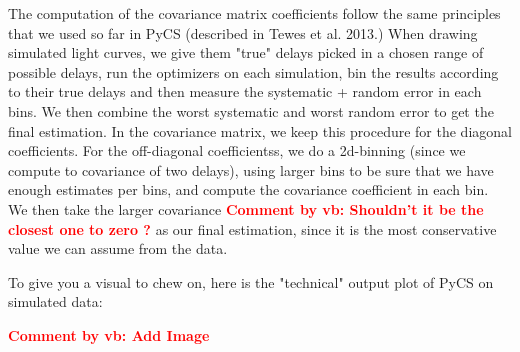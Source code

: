 \documentclass[11pt]{scrartcl}
\newcommand{\com}[2]{\xspace\textcolor{red}{\textbf{Comment by #1: #2}}}
\begin{document}
The computation of the covariance matrix coefficients follow the same 
principles that we used so far in PyCS (described in Tewes et al. 
2013.) When drawing simulated light curves, we give them "true" delays 
picked in a chosen range of possible delays, run the optimizers on each 
simulation, bin the results according to their true delays and then 
measure the systematic + random error in each bins. We then combine the 
worst systematic and worst random error to get the final estimation. In 
the covariance matrix, we keep this procedure for the diagonal 
coefficients. For the off-diagonal coefficientss, we do a 2d-binning 
(since we compute to covariance of two delays), using larger bins to be 
sure that we have enough estimates per bins, and compute the covariance 
coefficient in each bin. We then take the larger covariance 
\com{vb}{Shouldn't it be the closest one to zero ?} as our final 
estimation, since it is the most conservative value we can assume from 
the data.

To give you a visual to chew on, here is the "technical" output plot of 
PyCS on simulated data:

\com{vb}{Add Image}



\begin{itemize}

\end{itemize}
\end{document}
